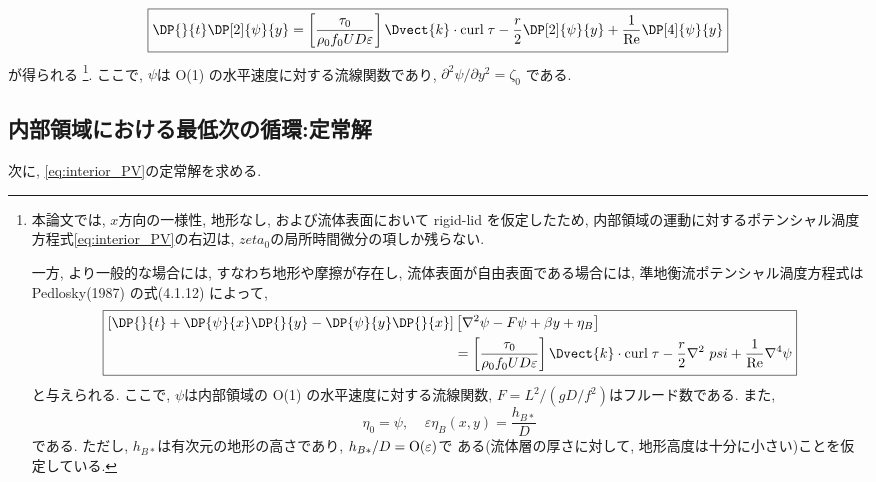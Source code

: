 \begin{equation}
 \boxed{
   \DP{}{t} \DP[2]{\psi}{y} = 
     \left[\dfrac{\tau_0}{\rho_0 f_0 U D \varepsilon}  \right] \Dvect{k} \cdot {\rm curl \;} \tau 
     - \dfrac{r}{2}\DP[2]{\psi}{y} + \dfrac{1}{\rm Re}\DP[4]{\psi}{y}
 }
\label{eq:interior_PV}
\end{equation}
が得られる%
\footnote{
本論文では, $x$方向の一様性, 地形なし, および流体表面において rigid-lid を仮定したため, 
内部領域の運動に対するポテンシャル渦度方程式\eqref{eq:interior_PV}の右辺は,
$zeta_0$の局所時間微分の項しか残らない. 

一方, より一般的な場合には, 
すなわち地形や摩擦が存在し, 流体表面が自由表面である場合には, 
準地衡流ポテンシャル渦度方程式は Pedlosky(1987) の式(4.1.12) によって, 
\begin{equation*}
\boxed{
 \begin{split}
   \left[ \DP{}{t} + \DP{\psi}{x}\DP{}{y} - \DP{\psi}{y}\DP{}{x} \right]
     &\left[\nabla^2 \psi - F \psi + \beta y + \eta_B \right] \\
     &= \left[\dfrac{\tau_0}{\rho_0 f_0 U D \varepsilon}  \right] \Dvect{k} \cdot {\rm curl \;} \tau 
     - \dfrac{r}{2}\nabla^2\ psi + \dfrac{1}{\rm Re} \nabla^4 \psi
 \end{split}
}
\end{equation*}
と与えられる.
ここで, $\psi$は内部領域の O(1) の水平速度に対する流線関数, 
$F=L^2/(gD/f^2)$はフルード数である. 
また, 
$$
\eta_0=\psi, \;\;\;\; 
\varepsilon \eta_B(x,y)=\dfrac{h_{B*}}{D}
$$
である. ただし, $h_{B*}$は有次元の地形の高さであり, $h_{B*}/D = {\rm O}(\varepsilon)$で
ある(流体層の厚さに対して, 地形高度は十分に小さい)ことを仮定している. 
}. 
ここで, $\psi$は O(1) の水平速度に対する流線関数であり, 
$\partial^2 \psi/ \partial y^2=\zeta_0$
である. 

\subsection{内部領域における最低次の循環:定常解}
次に, \eqref{eq:interior_PV}の定常解を求める. 

